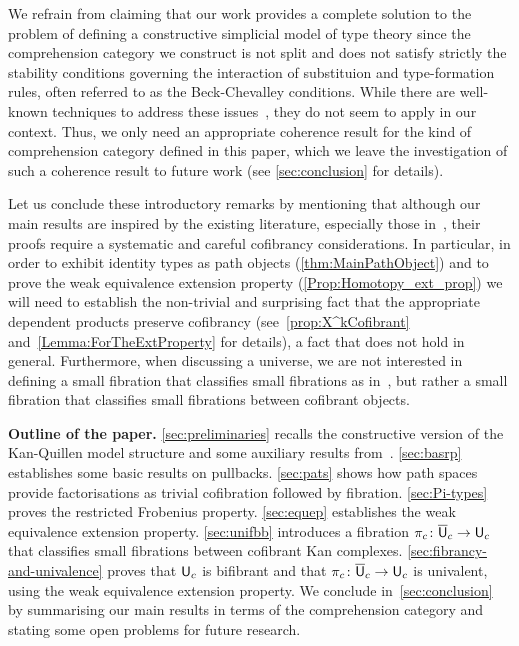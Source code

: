 \documentclass[reqno,10pt,a4paper,oneside,draft]{amsart}
\begin{document}
We refrain from claiming that our work provides a complete solution to the problem of defining a constructive simplicial model of type theory since the comprehension category we construct is not split and does not
satisfy strictly the stability conditions governing the interaction of substituion and type-formation rules, often
referred to as the Beck-Chevalley conditions. While there are well-known techniques to address these issues~\cite{voevodsky-simplicial-model,LumsdaineP:locuoc,ShulmanM:allths}, they do not seem to apply in our  context.
Thus, we only need an appropriate coherence result for the kind of 
comprehension category defined in this paper, 
which we leave the investigation of such a coherence result to future work (see \cref{sec:conclusion} for
details).

Let us conclude these introductory remarks by mentioning that although our main results are inspired by the existing literature, especially those in~\cite{voevodsky-simplicial-model}, their proofs require a systematic and careful cofibrancy considerations. In particular, in order to 
exhibit identity types as path objects (\cref{thm:MainPathObject}) and to prove the weak equivalence
extension property (\cref{Prop:Homotopy_ext_prop}) we will need to establish the non-trivial
and surprising fact that the appropriate dependent products preserve cofibrancy (see~\cref{prop:X^kCofibrant} and~\cref{Lemma:ForTheExtProperty} for details), a 
fact that does not hold in general. Furthermore, when discussing a universe, we are not interested in defining a small fibration that classifies small fibrations as in~\cite{voevodsky-simplicial-model}, but
rather a small fibration that classifies small fibrations between cofibrant objects. 




\smallskip

\noindent 
\textbf{Outline of the paper.} \cref{sec:preliminaries} recalls the constructive version of the 
Kan-Quillen model structure and some auxiliary results from~\cite{henry2019qms}. \cref{sec:basrp} establishes some basic results on pullbacks. \cref{sec:pats} shows how path spaces provide factorisations
as trivial cofibration followed by fibration. \cref{sec:Pi-types} proves the restricted Frobenius property. \cref{sec:equep}
establishes the weak equivalence extension property.
\cref{sec:unifbb} introduces a fibration $\pi_c \colon \overline{\mathsf{U}}_c \to \mathsf{U}_c$ that classifies small fibrations
between cofibrant Kan complexes. \cref{sec:fibrancy-and-univalence} proves that $\mathsf{U}_c$ is bifibrant and that $\pi_c \colon \overline{\mathsf{U}}_c \to \mathsf{U}_c$ is univalent, using the weak equivalence extension property.
We conclude in~\cref{sec:conclusion} by summarising our main results in terms of
the comprehension category and stating some open problems for future research.
\end{document}
